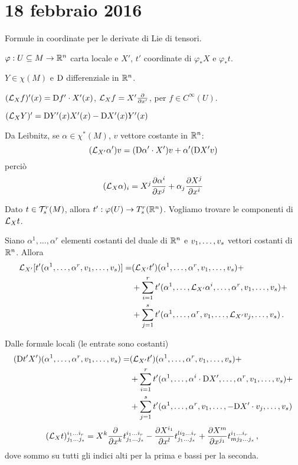 \chapter{18 febbraio 2016}

Formule in coordinate per le derivate di Lie di tensori.

$\varphi:U\subseteq M \to \R^n$ carta locale e $X'$, $t'$ coordinate di $\varphi_*X$ e $\varphi_*t$.

$Y\in\chi(M)$ e $\Diff$ differenziale in $\R^n$.

$(\Lie_Xf)'(x) = \Diff f'\cdot X'(x)$, $\Lie_X f = X'\DerParz{}{x'}$, per $f\in C^\infty(U)$.

$(\Lie_XY)' = \Diff Y'(x) X'(x) -\Diff X'(x) Y'(x)$

Da Leibnitz, se $\alpha\in\chi^*(M)$, $v$ vettore costante in $\R^n$:
\begin{equation*}
	(\Lie_{X'}\alpha')v = (\Diff \alpha'\cdot X') v + \alpha' (\Diff X' v)
\end{equation*}
perciò
\begin{equation*}
	(\Lie_X\alpha)_i = X^j \DerParz{\alpha^i}{x^j} + \alpha_j \DerParz{X^j}{x^i}
\end{equation*}

Dato $t\in\Tau_s^r(M)$, allora $t':\varphi(U)\to T_s^r(\R^n)$.
Vogliamo trovare le componenti di $\Lie_Xt$.

Siano $\alpha^1,\ldots,\alpha^r$ elementi costanti del duale di $\R^n$ e $\seq{v}{s}{,}$ vettori costanti di $\R^n$. Allora
\begin{align*}
	\Lie_{X'}[t'(\alpha^1,\ldots,\alpha^r,\seq{v}{s}{,})] =& (\Lie_{X'}t')(\alpha^1,\ldots,\alpha^r,\seq{v}{s}{,}) +\\
	&+\sum_{i=1}^r t'(\alpha^1,\ldots, \Lie_{X'}\alpha^i,\ldots, \alpha^r, \seq{v}{s}{,}) +\\
	&+\sum_{j=1}^s t'(\alpha^1,\ldots,\alpha^r,v_1,\ldots,\Lie_{X'}v_j,\ldots,v_s) \punto
\end{align*}

Dalle formule locali (le entrate sono costanti)
\begin{align*}
	(\Diff t'X') (\seqa{\alpha}{r}{,}, \seqb{v}{s}{,}) =& (\Lie_{X'}t')(\seqa{\alpha}{r}{,}, \seqb{v}{s}{,})+\\ 
	&+ \sum_{i=1}^r t'(\alpha^1,\ldots, \alpha^i\cdot\Diff X',\ldots, \alpha^r, \seq{v}{s}{,}) +\\
	&+\sum_{j=1}^s t'(\alpha^1,\ldots,\alpha^r,v_1,\ldots,-\Diff X'\cdot v_j,\ldots,v_s)
\end{align*}
\begin{equation*}
	(\Lie_Xt)_{\seqb{j}{s}{}}^{\seqb{i}{r}{}} = X^k \DerParz{}{x^k} t_{\seqb{j}{s}{}}^{\seqb{i}{r}{}} - \DerParz{X^{i_1}}{x^l} t_{\seqb{j}{s}{}}^{li_2\ldots i_r} + \DerParz{X^m}{x^{j_1}} t^{\seqb{i}{r}{}}_{mj_2\ldots j_s} \virgola
\end{equation*}
dove sommo su tutti gli indici alti per la prima e bassi per la seconda.

